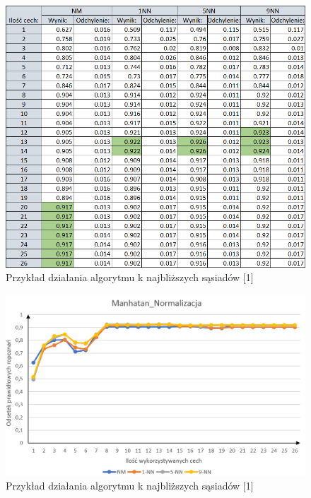 \documentclass[12pt]{article}
\begin{document}
\begin{figure}[H]
	\centering
		\includegraphics[scale=0.8]{images/algorithms/manhatan_norm_tab.png}
	\caption{Przykład działania algorytmu k najbliższych sąsiadów [1]}
\end{figure}

\begin{figure}[H]
	\centering
		\includegraphics[scale=0.66]{images/algorithms/manhatan_norm.png}
	\caption{Przykład działania algorytmu k najbliższych sąsiadów [1]}
\end{figure}
\end{document}
